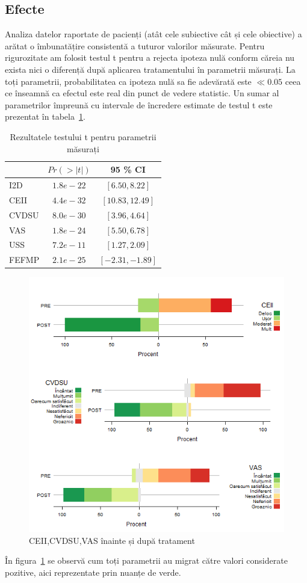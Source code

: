 \documentclass[12pt,draft]{article}
\begin{document}
\subsection{Efecte}
  Analiza datelor raportate de pacienți (atât cele subiective cât și cele obiective) a arătat o îmbunatățire consistentă a tuturor valorilor măsurate. Pentru rigurozitate am folosit testul t pentru a rejecta ipoteza nulă conform căreia nu exista nici o diferență după aplicarea tratamentului în parametrii măsurați. La toți parametrii, probabilitatea ca ipoteza nulă sa fie adevărată este $\ll 0.05$ ceea ce înseamnă ca efectul este real din punct de vedere statistic. Un sumar al parametrilor împreună cu intervale de încredere estimate de testul t este prezentat în tabela~\ref{tab:resTestSummary}.
  \begin{table}[H]
    \centering
    \begin{tabular}{|l|c|c|}
      \hline
       & $Pr(>|t|)$ & 95 \% CI \\   \hline
      I2D & 		$1.8e-22$ 	& $[ 6.50, 8.22 ]$ \\ \hline
      CEII & 		$4.4e-32$ 	& $[ 10.83, 12.49 ]$ \\ \hline
      CVDSU & $8.0e-30$ 	& $[ 3.96, 4.64 ]$ \\ \hline
      VAS & 		$1.8e-24$ 	& $[ 5.50, 6.78 ]$ \\ \hline
      USS & 		$7.2e-11$ 	& $[ 1.27, 2.09 ]$ \\ \hline
      FEFMP & $2.1e-25$ 	& $[ -2.31, -1.89 ]$ \\ \hline
    \end{tabular}
    \caption{Rezultatele testului t pentru parametrii măsurați} 
    \label{tab:resTestSummary}
  \end{table}
  \begin{figure}[H]
    \centering
    \includegraphics[width=0.8\linewidth]{incoResVariousStack}
    \caption{\ac{CEII},\ac{CVDSU},\ac{VAS} înainte și după tratament}
    \label{fig:incoResVariousStack}
  \end{figure}
  În figura~\ref{fig:incoResVariousStack} se observă cum toți parametrii au migrat către valori considerate pozitive, aici reprezentate prin nuanțe de verde. 
  
\end{document}
